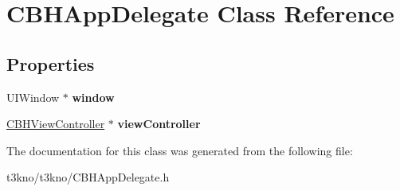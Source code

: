 \hypertarget{interface_c_b_h_app_delegate}{\section{C\-B\-H\-App\-Delegate Class Reference}
\label{interface_c_b_h_app_delegate}
}
\subsection*{Properties}
\begin{DoxyCompactItemize}
\item 
\hypertarget{interface_c_b_h_app_delegate_ae04748cdefebda525b266731b6c120a2}{U\-I\-Window $\ast$ {\bfseries window}}\label{interface_c_b_h_app_delegate_ae04748cdefebda525b266731b6c120a2}

\item 
\hypertarget{interface_c_b_h_app_delegate_a45a3f8627cb8346ca93c24f6d3e49f6c}{\hyperlink{interface_c_b_h_view_controller}{C\-B\-H\-View\-Controller} $\ast$ {\bfseries view\-Controller}}\label{interface_c_b_h_app_delegate_a45a3f8627cb8346ca93c24f6d3e49f6c}

\end{DoxyCompactItemize}


The documentation for this class was generated from the following file\-:\begin{DoxyCompactItemize}
\item 
t3kno/t3kno/C\-B\-H\-App\-Delegate.\-h\end{DoxyCompactItemize}
